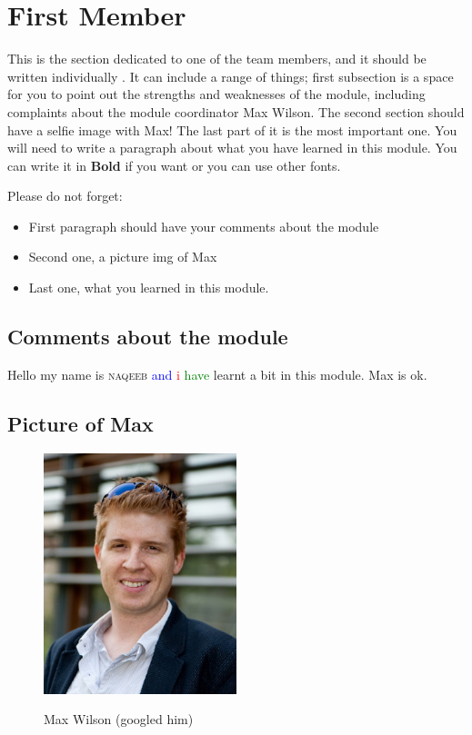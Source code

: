 \section{First Member}
This is the section dedicated to one of the team members, and it should be written individually . It can include a range of things; first subsection is a space for you to point out the strengths and weaknesses of the module, including complaints about the module coordinator Max Wilson. The second section should have a selfie image with Max! The last part of it is the most important one. You will need to write a paragraph about what you have learned in this module. You can write it in \textbf{Bold} if you want or you can use other fonts. 

Please do not forget:
\begin{itemize}
	\item First paragraph should have your comments about the module
	\item Second one, a picture img of Max
	\item Last one, what you learned in this module.
\end{itemize}

\subsection{Comments about the module}
Hello my name is \textsc{naqeeb} \textcolor{blue}{and} \textcolor{red}{i} \textcolor{green}{have} learnt a bit in this module. Max is ok.

\subsection{Picture of Max}


\begin{figure}[h]
\caption{Max Wilson (googled him)}
\centering
\includegraphics[width=0.5\textwidth]{max.jpg}
\label{fig:Max}
\end{figure}

